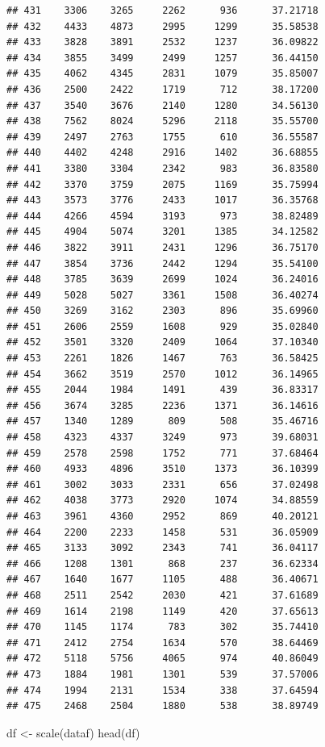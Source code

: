 \documentclass[
]{article}
\newenvironment{Shaded}{\begin{snugshade}}{\end{snugshade}}
\newcommand{\FunctionTok}[1]{\textcolor[rgb]{0.00,0.00,0.00}{#1}}
\newcommand{\NormalTok}[1]{#1}
\newcommand{\OtherTok}[1]{\textcolor[rgb]{0.56,0.35,0.01}{#1}}
\begin{document}
\begin{verbatim}
## 431    3306    3265     2262      936      37.21718
## 432    4433    4873     2995     1299      35.58538
## 433    3828    3891     2532     1237      36.09822
## 434    3855    3499     2499     1257      36.44150
## 435    4062    4345     2831     1079      35.85007
## 436    2500    2422     1719      712      38.17200
## 437    3540    3676     2140     1280      34.56130
## 438    7562    8024     5296     2118      35.55700
## 439    2497    2763     1755      610      36.55587
## 440    4402    4248     2916     1402      36.68855
## 441    3380    3304     2342      983      36.83580
## 442    3370    3759     2075     1169      35.75994
## 443    3573    3776     2433     1017      36.35768
## 444    4266    4594     3193      973      38.82489
## 445    4904    5074     3201     1385      34.12582
## 446    3822    3911     2431     1296      36.75170
## 447    3854    3736     2442     1294      35.54100
## 448    3785    3639     2699     1024      36.24016
## 449    5028    5027     3361     1508      36.40274
## 450    3269    3162     2303      896      35.69960
## 451    2606    2559     1608      929      35.02840
## 452    3501    3320     2409     1064      37.10340
## 453    2261    1826     1467      763      36.58425
## 454    3662    3519     2570     1012      36.14965
## 455    2044    1984     1491      439      36.83317
## 456    3674    3285     2236     1371      36.14616
## 457    1340    1289      809      508      35.46716
## 458    4323    4337     3249      973      39.68031
## 459    2578    2598     1752      771      37.68464
## 460    4933    4896     3510     1373      36.10399
## 461    3002    3033     2331      656      37.02498
## 462    4038    3773     2920     1074      34.88559
## 463    3961    4360     2952      869      40.20121
## 464    2200    2233     1458      531      36.05909
## 465    3133    3092     2343      741      36.04117
## 466    1208    1301      868      237      36.62334
## 467    1640    1677     1105      488      36.40671
## 468    2511    2542     2030      421      37.61689
## 469    1614    2198     1149      420      37.65613
## 470    1145    1174      783      302      35.74410
## 471    2412    2754     1634      570      38.64469
## 472    5118    5756     4065      974      40.86049
## 473    1884    1981     1301      539      37.57006
## 474    1994    2131     1534      338      37.64594
## 475    2468    2504     1880      538      38.89749
\end{verbatim}

\begin{Shaded}
\begin{Highlighting}[]
\NormalTok{df }\OtherTok{\textless{}{-}} \FunctionTok{scale}\NormalTok{(dataf)}
\FunctionTok{head}\NormalTok{(df)}
\end{Highlighting}
\end{Shaded}
\end{document}
